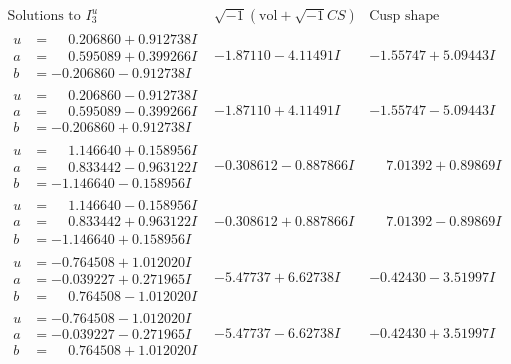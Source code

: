 \documentclass[1p]{elsarticle_modified}
\theoremstyle{definition}
\newcommand{\I}{\sqrt{-1}}
\begin{document}
$$\begin{array}{c|c|c}  
\text{Solutions to }I^u_{3}& \I (\text{vol} + \sqrt{-1}CS) & \text{Cusp shape}\\
 \hline 
\begin{aligned}
u &= \phantom{-}0.206860 + 0.912738 I \\
a &= \phantom{-}0.595089 + 0.399266 I \\
b &= -0.206860 - 0.912738 I\end{aligned}
 & -1.87110 - 4.11491 I & -1.55747 + 5.09443 I \\ \hline\begin{aligned}
u &= \phantom{-}0.206860 - 0.912738 I \\
a &= \phantom{-}0.595089 - 0.399266 I \\
b &= -0.206860 + 0.912738 I\end{aligned}
 & -1.87110 + 4.11491 I & -1.55747 - 5.09443 I \\ \hline\begin{aligned}
u &= \phantom{-}1.146640 + 0.158956 I \\
a &= \phantom{-}0.833442 - 0.963122 I \\
b &= -1.146640 - 0.158956 I\end{aligned}
 & -0.308612 - 0.887866 I & \phantom{-}7.01392 + 0.89869 I \\ \hline\begin{aligned}
u &= \phantom{-}1.146640 - 0.158956 I \\
a &= \phantom{-}0.833442 + 0.963122 I \\
b &= -1.146640 + 0.158956 I\end{aligned}
 & -0.308612 + 0.887866 I & \phantom{-}7.01392 - 0.89869 I \\ \hline\begin{aligned}
u &= -0.764508 + 1.012020 I \\
a &= -0.039227 + 0.271965 I \\
b &= \phantom{-}0.764508 - 1.012020 I\end{aligned}
 & -5.47737 + 6.62738 I & -0.42430 - 3.51997 I \\ \hline\begin{aligned}
u &= -0.764508 - 1.012020 I \\
a &= -0.039227 - 0.271965 I \\
b &= \phantom{-}0.764508 + 1.012020 I\end{aligned}
 & -5.47737 - 6.62738 I & -0.42430 + 3.51997 I \\ \hline\begin{aligned}

\end{aligned}
\end{array}$$
\end{document}
